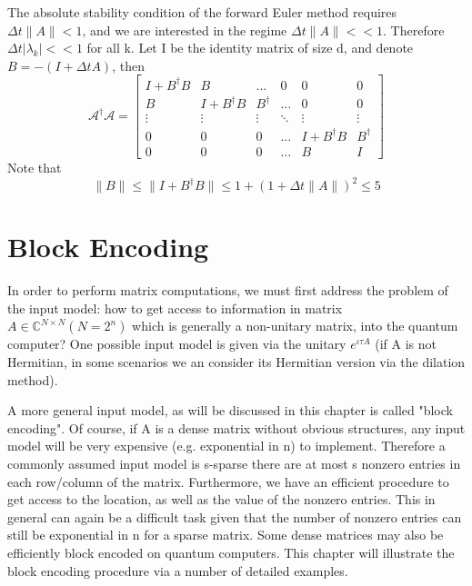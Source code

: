 \documentclass[12pt, oneside]{book}
\theoremstyle{definition}
\theoremstyle{definition}
\theoremstyle{remark}
\begin{document}
The absolute stability condition of the forward Euler method requires $\Delta t\|A\|<1$, and we are interested in the regime $\Delta t\|A\|<<1$. Therefore $\Delta t|\lambda_k|<<1$ for all k. Let I be the identity matrix of size d, and denote $B=-(I+\Delta tA)$, then
\[
\mathcal{A}^{\dagger}\mathcal{A}=\begin{bmatrix} I + B^{\dagger}B & B & \ldots & 0 & 0 & 0 \\ B & I + B^{\dagger}B & B^{\dagger} & \ldots & 0 & 0 \\
\vdots & \vdots & \vdots & \ddots &\vdots & \vdots  \\
0 & 0 & 0 & \ldots & I+B^{\dagger}B & B^{\dagger} \\
0 & 0 & 0 & \ldots & B & I \end{bmatrix}
\]
Note that
\[
\|B\|\leq \|I+B^{\dagger}B\|\leq 1+(1+\Delta t\|A\|)^2\leq 5
\]

\chapter{Block Encoding}
In order to perform matrix computations, we must first address the problem of the input model: how to get access to information in matrix $A\in \mathbb{C}^{N \times N} (N=2^n)$ which is generally a non-unitary matrix, into the quantum computer? One possible input model is given via the unitary $e^{\iota \tau A}$ (if A is not Hermitian, in some scenarios we an consider its Hermitian version via the dilation method).

A more general input model, as will be discussed in this chapter is called "block encoding". Of course, if A is a dense matrix without obvious structures, any input model will be very expensive (e.g. exponential in n) to implement. Therefore a commonly assumed input model is s-sparse there are at most s nonzero entries in each row/column of the matrix. Furthermore, we have an efficient procedure to get access to the location, as well as the value of the nonzero entries. This in general can again be a difficult task given that the number of nonzero entries can still be exponential in n for a sparse matrix. Some dense matrices may also be efficiently block encoded on quantum computers. This chapter will illustrate the block encoding procedure via a number of detailed examples.
\end{document}

